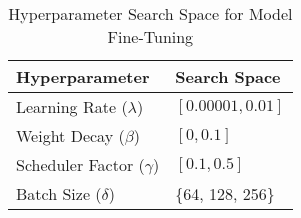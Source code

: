 \begin{table}[!ht]
    \centering
    \caption{Hyperparameter Search Space for Model Fine-Tuning}
    \label{tab:hyperparameters}
    \begin{tabular}{ll}
    \toprule
    \textbf{Hyperparameter} & \textbf{Search Space} \\
    \midrule
    Learning Rate (\( \lambda \)) & $[0.00001, 0.01]$ \\
    Weight Decay (\( \beta \)) & $[0, 0.1]$ \\
    Scheduler Factor (\(\gamma\)) & $[0.1, 0.5]$ \\
    Batch Size (\(\delta\)) & \{64, 128, 256\} \\
    \bottomrule
    \end{tabular}
    \end{table}
    